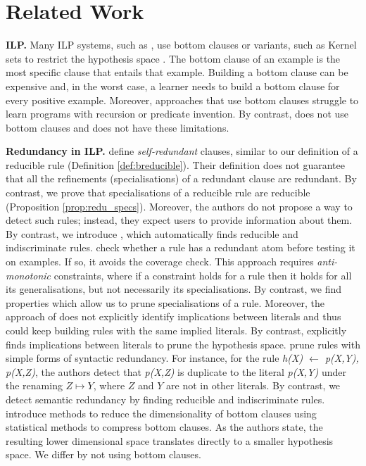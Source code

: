 \section{Related Work}
\label{sec:related}

\textbf{ILP.}
Many ILP systems, such as \ale{} \cite{aleph}, use bottom clauses \cite{progol} or variants, such as Kernel sets \cite{xhail} to restrict the hypothesis space \cite{progol}. 
The bottom clause of an example is the most specific clause that entails that example.
Building a bottom clause can be expensive \cite{progol} and, in the worst case, a learner needs to build a bottom clause for every positive example.
Moreover, approaches that use bottom clauses struggle to learn programs with recursion or predicate invention.
By contrast, \name{} does not use bottom clauses and does not have these limitations.

\textbf{Redundancy in ILP.}
 define \emph{self-redundant} clauses, similar to our definition of a reducible rule (Definition \ref{def:breducible}).
Their definition does not guarantee that all the refinements (specialisations) of a redundant clause are redundant.
By contrast, we prove that specialisations of a reducible rule are reducible (Proposition \ref{prop:redu_specs}).
Moreover, the authors do not propose a way to detect such rules; instead, they expect users to provide information about them.
By contrast, we introduce \name{}, which automatically finds reducible and indiscriminate rules.
 check whether a rule has a redundant atom before testing it on examples.
If so, it avoids the coverage check.
This approach requires \textit{anti-monotonic} constraints, where if a constraint holds for a rule then it holds for all its generalisations, but not necessarily its specialisations.
By contrast, we find properties which allow us to prune specialisations of a rule.
Moreover, the approach of  does not explicitly identify implications between literals and thus could keep building rules with the same implied literals.
By contrast, \name{} explicitly finds implications between literals to prune the hypothesis space.
 prune rules with simple forms of syntactic redundancy.
For instance, for the rule \emph{h(X) $\leftarrow$ p(X,Y), p(X,Z)}, the authors detect that \emph{p(X,Z)} is duplicate to the literal \emph{p(X,Y)} under the renaming $Z \mapsto Y$, where $Z$ and $Y$ are not in other literals.
By contrast, we detect semantic redundancy by finding reducible and indiscriminate rules.
 introduce methods to reduce the dimensionality of bottom clauses using statistical methods to compress bottom clauses. 
As the authors state, the resulting lower dimensional space translates directly to a smaller hypothesis space. 
We differ by not using bottom clauses.


